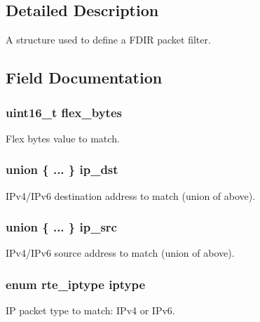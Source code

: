 \subsection{Detailed Description}
A structure used to define a F\+D\+I\+R packet filter. 

\subsection{Field Documentation}
\hypertarget{structrte__fdir__filter_a7eec7b6909117bd1391bf812aa0658af}{}
\subsubsection[{flex\+\_\+bytes}]{\setlength{\rightskip}{0pt plus 5cm}uint16\+\_\+t flex\+\_\+bytes}\label{structrte__fdir__filter_a7eec7b6909117bd1391bf812aa0658af}
Flex bytes value to match. \hypertarget{structrte__fdir__filter_af50d026067facc14e9f59daabf3374d9}{}
\subsubsection[{ip\+\_\+dst}]{\setlength{\rightskip}{0pt plus 5cm}union \{ ... \}   ip\+\_\+dst}\label{structrte__fdir__filter_af50d026067facc14e9f59daabf3374d9}
I\+Pv4/\+I\+Pv6 destination address to match (union of above). \hypertarget{structrte__fdir__filter_ad00d8229fa71d4430e00fad6377b4f56}{}
\subsubsection[{ip\+\_\+src}]{\setlength{\rightskip}{0pt plus 5cm}union \{ ... \}   ip\+\_\+src}\label{structrte__fdir__filter_ad00d8229fa71d4430e00fad6377b4f56}
I\+Pv4/\+I\+Pv6 source address to match (union of above). \hypertarget{structrte__fdir__filter_ac40152ee74c401e0f29eaa930ee7ea50}{}
\subsubsection[{iptype}]{\setlength{\rightskip}{0pt plus 5cm}enum {\bf rte\+\_\+iptype} iptype}\label{structrte__fdir__filter_ac40152ee74c401e0f29eaa930ee7ea50}
I\+P packet type to match\+: I\+Pv4 or I\+Pv6. \hypertarget{structrte__fdir__filter_a132e9dc13134d538f27e0d7fd09a7bc9}{}
